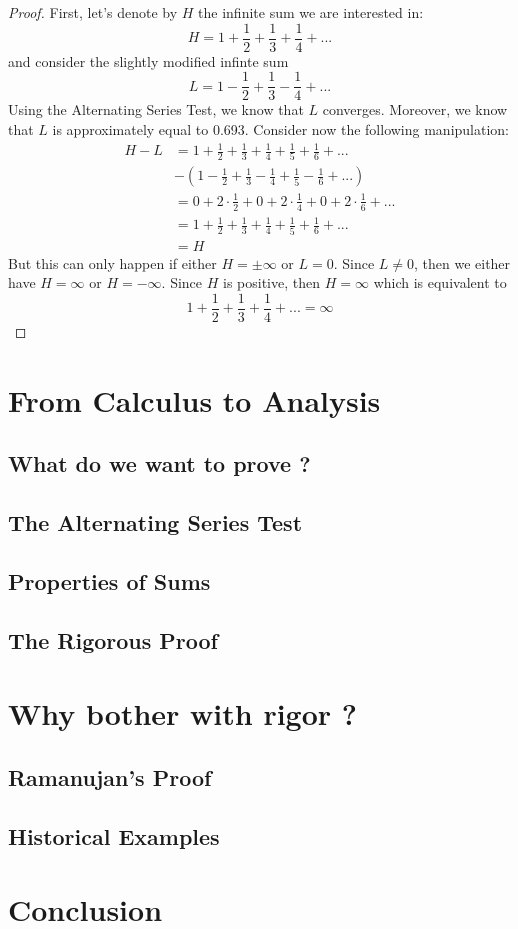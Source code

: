 \documentclass[12pt]{article}
\theoremstyle{definition}
\begin{document}
\begin{proof}
    First, let's denote by $H$ the infinite sum we are interested in:
    $$H = 1 + \frac{1}{2} + \frac{1}{3} + \frac{1}{4} + ...$$
    and consider the slightly modified infinte sum
    $$L = 1 - \frac{1}{2} + \frac{1}{3} - \frac{1}{4} + ...$$
    Using the Alternating Series Test, we know that $L$ converges. Moreover, we know that $L$ is approximately equal to 0.693. Consider now the following manipulation:
    \begin{align*}
        H - L &= 1 + \frac{1}{2} + \frac{1}{3} + \frac{1}{4} + \frac{1}{5} + \frac{1}{6} + ... \\
        & - \left(1 - \frac{1}{2} + \frac{1}{3} - \frac{1}{4} + \frac{1}{5} - \frac{1}{6} + ...\right) \\
        &= 0 + 2\cdot \frac{1}{2} + 0 + 2\cdot \frac{1}{4} + 0 + 2\cdot \frac{1}{6} + ... \\
        &= 1 + \frac{1}{2} + \frac{1}{3} + \frac{1}{4} + \frac{1}{5} + \frac{1}{6} + ... \\
        &= H
    \end{align*}
    But this can only happen if either $H = \pm \infty$ or $L = 0$. Since $L \neq 0$, then we either have $H = \infty$ or $H = -\infty$. Since $H$ is positive, then $H = \infty$ which is equivalent to
    $$ 1 + \frac{1}{2} + \frac{1}{3} + \frac{1}{4} + ... = \infty$$
\end{proof}

\section{From Calculus to Analysis}

\subsection{What do we want to prove ?}

\subsection{The Alternating Series Test}

\subsection{Properties of Sums}

\subsection{The Rigorous Proof}

\section{Why bother with rigor ?}

\subsection{Ramanujan's Proof}

\subsection{Historical Examples}

\section{Conclusion}


\newpage


\end{document}
